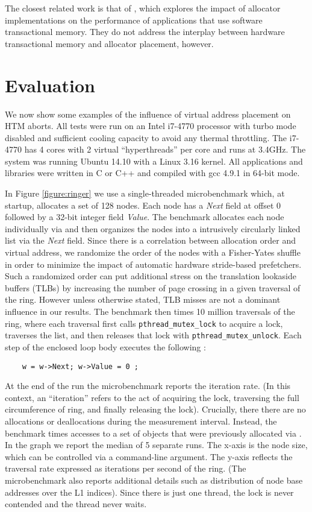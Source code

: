 \documentclass[preprint]{sigplanconf}
\begin{document}
The closest related work is that of
\citet{ppopp15-baldassin}, which explores the impact of \malloc{} allocator implementations
on the performance of applications that use software transactional memory.  They
do not address the interplay between hardware transactional memory and
allocator placement, however. 

\section{Evaluation} 

We now show some examples of the influence of virtual address placement
on HTM aborts.  All tests were run on an Intel i7-4770 processor with
turbo mode disabled and sufficient cooling capacity to avoid any thermal throttling. 
The i7-4770 has 4 cores with 2 virtual ``hyperthreads'' per core and runs
at 3.4GHz.  The system was running Ubuntu 14.10 with a Linux 3.16 kernel.  
All applications and libraries were written in C or C++ and compiled with 
gcc 4.9.1 in 64-bit mode. 


In Figure \ref{figure:ringer} we use a single-threaded microbenchmark which, 
at startup, allocates a set of 128 nodes.  
Each node has a \emph{Next} field at 
offset 0 followed by a 32-bit integer field \emph{Value}.  The benchmark allocates each
node individually via \malloc{} and then organizes the nodes into a 
intrusively circularly linked list via the \emph{Next} field.  
Since there is a correlation between allocation order and virtual address,
we randomize the order of the nodes with a Fisher-Yates shuffle in order
to minimize the impact of automatic hardware stride-based prefetchers. 
Such a randomized order can put additional stress on the translation lookaside buffers 
(TLBs) by increasing the number of page crossing in a given traversal of the ring.
However unless otherwise stated, TLB misses are not a dominant influence in our results.  
The benchmark then times 10 million traversals of the ring, where each traversal first calls
\texttt{pthread\_mutex\_lock} to acquire a lock, traverses the list, and then
releases that lock with \texttt{pthread\_mutex\_unlock}.  Each step of the 
enclosed loop body executes the following :
\begin{verbatim}    w = w->Next; w->Value = 0 ; \end{verbatim} 
At the end of the run the microbenchmark reports the iteration rate. 
(In this context, an ``iteration'' refers to the act of acquiring the
lock, traversing the full circumference of ring, and finally releasing the lock). 
Crucially, there there are no allocations or deallocations during the measurement
interval.  Instead, the benchmark times accesses to a set of objects that were previously
allocated via \malloc{}. 
In the graph we report the median of 5 separate runs.  The x-axis is the node size, 
which can be controlled via a command-line argument.  The y-axis reflects the 
traversal rate expressed as iterations per second of the ring.  (The 
microbenchmark also reports additional details such as distribution of node
base addresses over the L1 indices).  Since there is just one thread, the lock is never 
contended and the thread never waits. 
\end{document}
